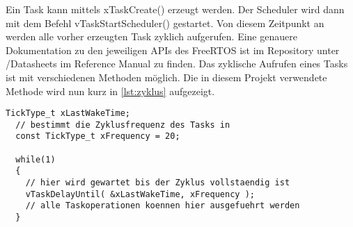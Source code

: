 Ein Task kann mittels xTaskCreate() erzeugt werden. Der Scheduler wird dann mit dem Befehl vTaskStartScheduler() gestartet. Von diesem Zeitpunkt an werden alle vorher erzeugten Task zyklich aufgerufen. Eine genauere Dokumentation zu den jeweiligen APIs des FreeRTOS ist im Repository unter /Datasheets im Reference Manual zu finden. Das zyklische Aufrufen eines Tasks ist mit verschiedenen Methoden möglich. Die in diesem Projekt verwendete Methode wird nun kurz in \ref{lst:zyklus} aufgezeigt.

\begin{lstlisting}[caption={Taskzyklus erzeugen}, label=lst:zyklus]
  TickType_t xLastWakeTime;
  // bestimmt die Zyklusfrequenz des Tasks in
  const TickType_t xFrequency = 20;

  while(1)
  {
    // hier wird gewartet bis der Zyklus vollstaendig ist
    vTaskDelayUntil( &xLastWakeTime, xFrequency );
    // alle Taskoperationen koennen hier ausgefuehrt werden
  }
\end{lstlisting}



